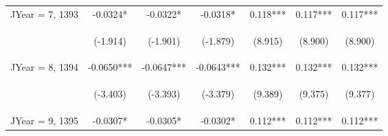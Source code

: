 \documentclass[]{standalone}
\begin{document}
\begin{tabular}{lcccccc}
    JYear = 7, 1393  & -0.0324*                                       & -0.0322*                                       & -0.0318*                                       & 0.118***                                       & 0.117***                                       & 0.117***                                       \\
    \vspace{4pt}     & \begin{footnotesize}(-1.914)\end{footnotesize} & \begin{footnotesize}(-1.901)\end{footnotesize} & \begin{footnotesize}(-1.879)\end{footnotesize} & \begin{footnotesize}(8.915)\end{footnotesize}  & \begin{footnotesize}(8.900)\end{footnotesize}  & \begin{footnotesize}(8.900)\end{footnotesize}  \\
    JYear = 8, 1394  & -0.0650***                                     & -0.0647***                                     & -0.0643***                                     & 0.132***                                       & 0.132***                                       & 0.132***                                       \\
    \vspace{4pt}     & \begin{footnotesize}(-3.403)\end{footnotesize} & \begin{footnotesize}(-3.393)\end{footnotesize} & \begin{footnotesize}(-3.379)\end{footnotesize} & \begin{footnotesize}(9.389)\end{footnotesize}  & \begin{footnotesize}(9.375)\end{footnotesize}  & \begin{footnotesize}(9.377)\end{footnotesize}  \\
    JYear = 9, 1395  & -0.0307*                                       & -0.0305*                                       & -0.0302*                                       & 0.112***                                       & 0.112***                                       & 0.112***                                       \\

\end{tabular}
\end{document}
